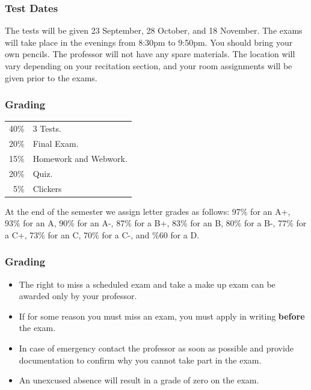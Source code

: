 \begin{frame}
  \frametitle{Test Dates}

The tests will be given 23 September, 28 October, and 18 November. The
exams will take place in the evenings from 8:30pm to 9:50pm. You
should bring your own pencils.  The professor will not have any spare
materials. The location will vary depending on your recitation
section, and your room assignments will be given prior to the exams.
  
\end{frame}


\begin{frame}
  \frametitle{Grading}

  \begin{tabular}[t]{rl}
    40\% & 3 Tests. \\
    20\% & Final Exam. \\
    15\% & Homework and Webwork. \\
    20\% & Quiz. \\
    5\% & Clickers
  \end{tabular}

  \vfill

    At the end of the semester we assign letter grades as follows:
    97\% for an A+, 93\% for an A, 90\% for an A-, 
    87\% for a  B+, 83\% for an B, 80\% for a B-, 
    77\% for a  C+, 73\% for an C, 70\% for a C-, 
    and \%60 for a D.

    \vfill

\end{frame}

\begin{frame}
  \frametitle{Grading}

  \begin{itemize}
  \item The right to miss a scheduled exam and take a make up exam can
    be awarded only by your professor.
  \item If for some reason you must miss an exam, you must apply in
    writing {\bf before} the exam.
  \item In case of emergency contact the professor as soon as possible
    and provide documentation to confirm why you cannot take part in
    the exam. 
  \item An unexcused absence will result in a grade of zero on the
    exam.
  \end{itemize}


  
\end{frame}


